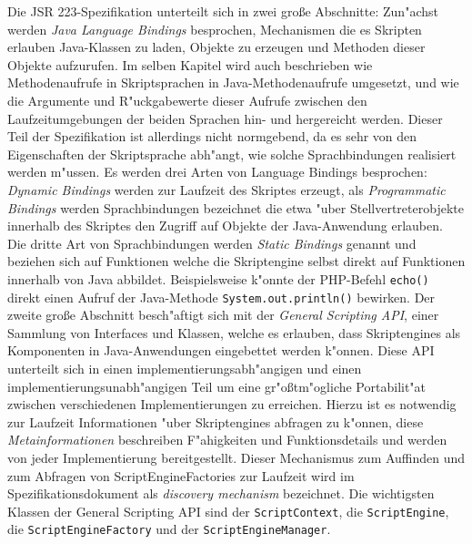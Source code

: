 Die JSR 223-Spezifikation unterteilt sich in zwei gro\ss e Abschnitte: Zun"achst werden \emph{Java Language Bindings} besprochen, Mechanismen
die es Skripten erlauben Java-Klassen zu laden, Objekte zu erzeugen und Methoden dieser Objekte aufzurufen. Im selben Kapitel wird
auch beschrieben wie Methodenaufrufe in Skriptsprachen in Java-Methodenaufrufe umgesetzt, und wie die Argumente und 
R"uckgabewerte dieser Aufrufe zwischen den Laufzeitumgebungen der beiden Sprachen hin- und hergereicht werden. Dieser Teil der Spezifikation ist allerdings
nicht normgebend, da es sehr von den Eigenschaften der Skriptsprache abh"angt, wie solche Sprachbindungen realisiert werden m"ussen.
Es werden drei Arten von Language Bindings besprochen: \emph{Dynamic Bindings} werden zur Laufzeit des Skriptes erzeugt, als
\emph{Programmatic Bindings} werden Sprachbindungen bezeichnet die etwa "uber Stellvertreterobjekte innerhalb des Skriptes 
den Zugriff auf Objekte der Java-Anwendung erlauben. Die dritte Art von Sprachbindungen werden \emph{Static Bindings} genannt und
beziehen sich auf Funktionen welche die Skriptengine selbst direkt auf Funktionen innerhalb von Java abbildet. Beispielsweise
k"onnte der PHP-Befehl \texttt{echo()} direkt einen Aufruf der Java-Methode \texttt{System.out.println()} bewirken.
Der zweite gro\ss e Abschnitt besch"aftigt sich mit der \emph{General Scripting API}, einer Sammlung von Interfaces und Klassen, 
welche es erlauben, dass Skriptengines als Komponenten in Java-Anwendungen eingebettet werden k"onnen. Diese API unterteilt sich
in einen implementierungsabh"angigen und einen implementierungsunabh"angigen Teil um eine gr"o\ss tm"ogliche Portabilit"at zwischen
verschiedenen Implementierungen zu erreichen. Hierzu ist es notwendig zur Laufzeit Informationen "uber Skriptengines abfragen
zu k"onnen, diese \emph{Metainformationen} beschreiben F"ahigkeiten und Funktionsdetails und werden von jeder Implementierung bereitgestellt.
Dieser Mechanismus zum Auffinden und zum Abfragen von ScriptEngineFactories zur Laufzeit wird im Spezifikationsdokument 
als \emph{discovery mechanism} bezeichnet.
Die wichtigsten Klassen der General Scripting API sind der \texttt{ScriptContext},
die \texttt{ScriptEngine}, die \texttt{ScriptEngineFactory} und der \texttt{ScriptEngineManager}.
